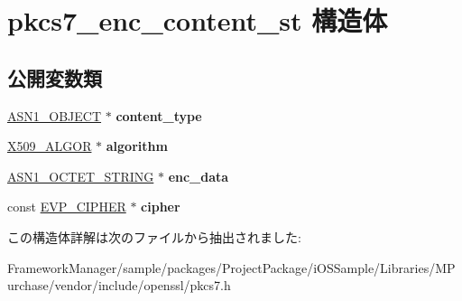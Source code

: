\hypertarget{structpkcs7__enc__content__st}{}\section{pkcs7\+\_\+enc\+\_\+content\+\_\+st 構造体}
\label{structpkcs7__enc__content__st}
\subsection*{公開変数類}
\begin{DoxyCompactItemize}
\item 
\hypertarget{structpkcs7__enc__content__st_aae31932dd3ab5e4b1e54e9915f9c547c}{}\hyperlink{structasn1__object__st}{A\+S\+N1\+\_\+\+O\+B\+J\+E\+C\+T} $\ast$ {\bfseries content\+\_\+type}\label{structpkcs7__enc__content__st_aae31932dd3ab5e4b1e54e9915f9c547c}

\item 
\hypertarget{structpkcs7__enc__content__st_af6c78a84b4ca86334dfc04a072ce1117}{}\hyperlink{struct_x509__algor__st}{X509\+\_\+\+A\+L\+G\+O\+R} $\ast$ {\bfseries algorithm}\label{structpkcs7__enc__content__st_af6c78a84b4ca86334dfc04a072ce1117}

\item 
\hypertarget{structpkcs7__enc__content__st_ab4d08c0f1b94885ea0d0380ef4745c7b}{}\hyperlink{structasn1__string__st}{A\+S\+N1\+\_\+\+O\+C\+T\+E\+T\+\_\+\+S\+T\+R\+I\+N\+G} $\ast$ {\bfseries enc\+\_\+data}\label{structpkcs7__enc__content__st_ab4d08c0f1b94885ea0d0380ef4745c7b}

\item 
\hypertarget{structpkcs7__enc__content__st_abb4444669fdf67803367ebddf34b8aff}{}const \hyperlink{structevp__cipher__st}{E\+V\+P\+\_\+\+C\+I\+P\+H\+E\+R} $\ast$ {\bfseries cipher}\label{structpkcs7__enc__content__st_abb4444669fdf67803367ebddf34b8aff}

\end{DoxyCompactItemize}


この構造体詳解は次のファイルから抽出されました\+:\begin{DoxyCompactItemize}
\item 
Framework\+Manager/sample/packages/\+Project\+Package/i\+O\+S\+Sample/\+Libraries/\+M\+Purchase/vendor/include/openssl/pkcs7.\+h\end{DoxyCompactItemize}
